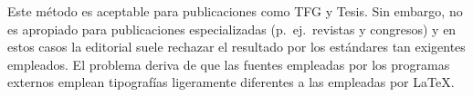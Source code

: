 \documentclass[11pt,a4paper]{article}
\begin{document}
Este método es aceptable para publicaciones como TFG y Tesis. Sin embargo, no es apropiado para publicaciones especializadas (p.~ej.\ revistas y congresos) y en estos casos la editorial suele rechazar el resultado por los estándares tan exigentes empleados. El problema deriva de que las fuentes empleadas por los programas externos emplean tipografías ligeramente diferentes a las empleadas por \LaTeX.
\end{document}
